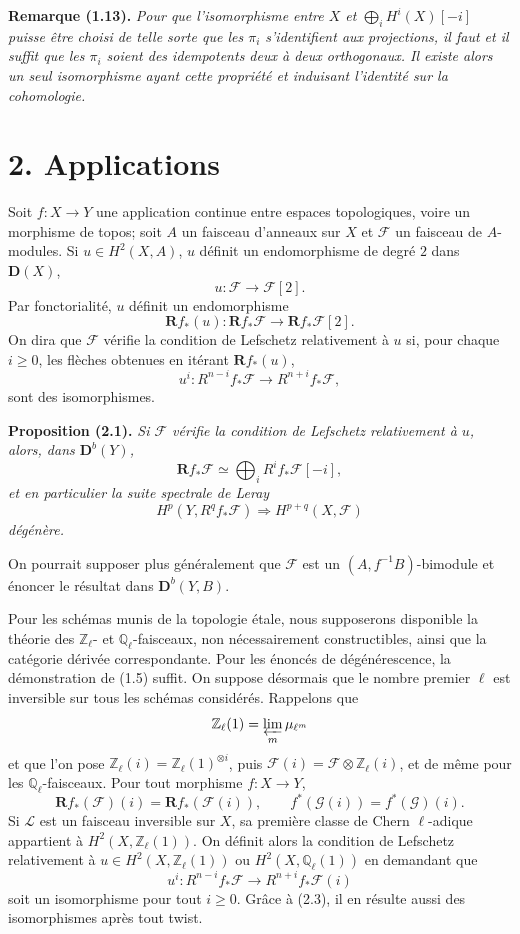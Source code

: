 \documentclass[11pt]{article}
\newcommand{\bD}{\mathbf D}
\newcommand{\cF}{\mathcal F}
\newcommand{\cG}{\mathcal G}
\newcommand{\bR}{\mathbf R}
\newcommand{\Ql}{\mathbb Q_\ell}
\newcommand{\Zl}{\mathbb Z_\ell}
\newenvironment{named}[1]{\par\medskip\noindent\textbf{#1}\itshape}{\par\medskip}
\begin{document}
\begin{named}{Remarque (1.13).}
Pour que l'isomorphisme entre $X$ et $\bigoplus_iH^i(X)[-i]$ puisse être choisi de telle sorte que les $\pi_i$ s'identifient aux projections, il faut et il suffit que les $\pi_i$ soient des idempotents deux à deux orthogonaux. Il existe alors un seul isomorphisme ayant cette propriété et induisant l'identité sur la cohomologie.
\end{named}

\section*{2. Applications}
Soit $f:X\to Y$ une application continue entre espaces topologiques, voire un morphisme de topos; soit $A$ un faisceau d'anneaux sur $X$ et $\cF$ un faisceau de $A$-modules. Si $u\in H^2(X,A)$, $u$ définit un endomorphisme de degré $2$ dans $\bD(X)$,
\[
u:\cF\longrightarrow\cF[2].
\]
Par fonctorialité, $u$ définit un endomorphisme
\[
\bR f_*(u):\bR f_*\cF\longrightarrow\bR f_*\cF[2].
\]
On dira que $\cF$ vérifie la condition de Lefschetz relativement à $u$ si, pour chaque $i\ge0$, les flèches obtenues en itérant $\bR f_*(u)$,
\[
u^i:R^{n-i}f_*\cF\longrightarrow R^{n+i}f_*\cF,
\]
sont des isomorphismes.

\begin{named}{Proposition (2.1).}
Si $\cF$ vérifie la condition de Lefschetz relativement à $u$, alors, dans $\bD^b(Y)$,
\[
\bR f_*\cF\simeq\bigoplus_i R^if_*\cF[-i],
\]
et en particulier la suite spectrale de Leray
\[
H^p(Y,R^qf_*\cF)\Longrightarrow H^{p+q}(X,\cF)
\]
dégénère.
\end{named}
On pourrait supposer plus généralement que $\cF$ est un $(A,f^{-1}B)$-bimodule et énoncer le résultat dans $\bD^b(Y,B)$.

Pour les schémas munis de la topologie étale, nous supposerons disponible la théorie des $\Zl$- et $\Ql$-faisceaux, non nécessairement constructibles, ainsi que la catégorie dérivée correspondante. Pour les énoncés de dégénérescence, la démonstration de (1.5) suffit. On suppose désormais que le nombre premier $\ell$ est inversible sur tous les schémas considérés. Rappelons que
\[
\Zl(1)=\varprojlim_m\mu_{\ell^m}
\]
et que l'on pose $\Zl(i)=\Zl(1)^{\otimes i}$, puis $\cF(i)=\cF\otimes\Zl(i)$, et de même pour les $\Ql$-faisceaux. Pour tout morphisme $f:X\to Y$,
\begin{equation}\tag{2.3}
\bR f_*(\cF)(i)=\bR f_*(\cF(i)),\qquad f^*(\cG(i))=f^*(\cG)(i).
\end{equation}
Si $\mathscr L$ est un faisceau inversible sur $X$, sa première classe de Chern $\ell$-adique appartient à $H^2(X,\Zl(1))$. On définit alors la condition de Lefschetz relativement à $u\in H^2(X,\Zl(1))$ ou $H^2(X,\Ql(1))$ en demandant que
\[
u^i:R^{n-i}f_*\cF\longrightarrow R^{n+i}f_*\cF(i)
\]
soit un isomorphisme pour tout $i\ge0$. Grâce à (2.3), il en résulte aussi des isomorphismes après tout twist.
\end{document}
